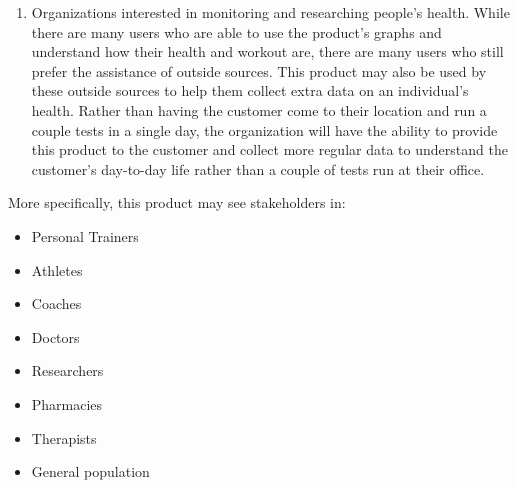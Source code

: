 \documentclass[letterpaper,english, 12pt]{scrreprt}
\begin{document}
\begin{enumerate}
	\item Organizations interested in monitoring and researching people's health. While there are many users who are able to use the product's graphs and understand how their health and workout are, there are many users who still prefer the assistance of outside sources. This product may also be used by these outside sources to help them collect extra data on an individual's health. Rather than having the customer come to their location and run a couple tests in a single day, the organization will have the ability to provide this product to the customer and collect more regular data to understand the customer's day-to-day life rather than a couple of tests run at their office.
\end{enumerate}

More specifically, this product may see stakeholders in:
\begin{itemize}
	\item Personal Trainers
	\item Athletes
	\item Coaches
	\item Doctors
	\item Researchers
	\item Pharmacies
	\item Therapists
	\item General population
\end{itemize}
\end{document}
